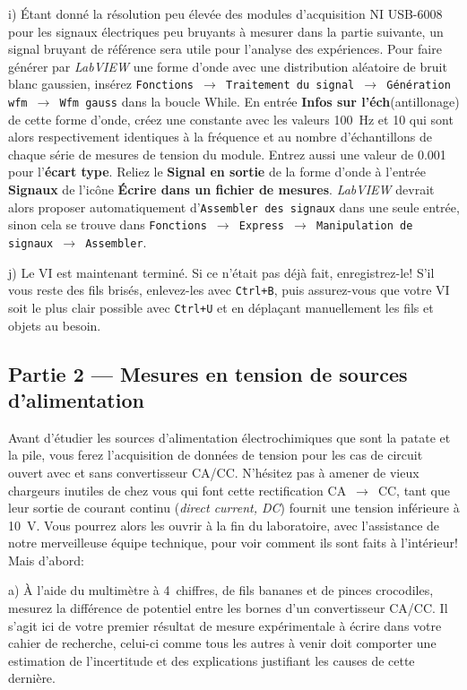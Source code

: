\documentclass[canadien,12pt,oneside,letterpaper]{article}
\begin{document}
i) Étant donné la résolution peu élevée des modules d'acquisition NI USB-6008 pour les signaux électriques peu bruyants à mesurer dans la partie suivante, un signal bruyant de référence sera utile pour l'analyse des expériences. Pour faire générer par \textit{LabVIEW} une forme d'onde avec une distribution aléatoire de bruit blanc gaussien, insérez \texttt{Fonctions $\rightarrow$ Traitement du signal $\rightarrow$ Génération wfm $\rightarrow$ Wfm gauss} dans la boucle While. En entrée \textbf{Infos sur l'éch}(antillonage) de cette forme d'onde, créez une constante avec les valeurs 100~Hz et 10 qui sont alors respectivement identiques à la fréquence et au nombre d'échantillons de chaque série de mesures de tension du module. Entrez aussi une valeur de 0.001 pour l'\textbf{écart type}. Reliez le \textbf{Signal en sortie} de la forme d'onde à l'entrée \textbf{Signaux} de l'icône \textbf{Écrire dans un fichier de mesures}. \textit{LabVIEW} devrait alors proposer automatiquement d'\texttt{Assembler des signaux} dans une seule entrée, sinon cela se trouve dans \texttt{Fonctions $\rightarrow$ Express $\rightarrow$ Manipulation de signaux $\rightarrow$ Assembler}.

j) Le VI est maintenant terminé. Si ce n'était pas déjà fait, enregistrez-le! S'il vous reste des fils brisés, enlevez-les avec \texttt{Ctrl+B}, puis assurez-vous que votre VI soit le plus clair possible avec \texttt{Ctrl+U} et en déplaçant manuellement les fils et objets au besoin.


\subsection{Partie 2 --- Mesures en tension de sources d'alimentation}

Avant d'étudier les sources d'alimentation électrochimiques que sont la patate et la pile, vous ferez l'acquisition de données de tension pour les cas de circuit ouvert avec et sans convertisseur CA/CC. N'hésitez pas à amener de vieux chargeurs inutiles de chez vous qui font cette rectification CA~$\rightarrow$~CC, tant que leur sortie de courant continu (\textit{direct current, DC}) fournit une tension inférieure à 10~V. Vous pourrez alors les ouvrir à la fin du laboratoire, avec l'assistance de notre merveilleuse équipe technique, pour voir comment ils sont faits à l'intérieur! Mais d'abord:

a) À l'aide du multimètre à 4\textonehalf~chiffres, de fils bananes et de pinces crocodiles, mesurez la différence de potentiel entre les bornes d'un convertisseur CA/CC. Il s'agit ici de votre premier résultat de mesure expérimentale à écrire dans votre cahier de recherche, celui-ci comme tous les autres à venir doit comporter une estimation de l'incertitude et des explications justifiant les causes de cette dernière.
\end{document}
